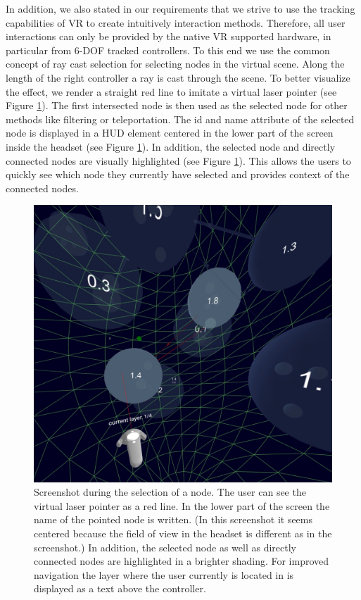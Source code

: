 In addition, we also stated in our requirements that we strive to use the tracking capabilities of VR to create intuitively interaction methods.
Therefore, all user interactions can only be provided by the native VR supported hardware, in particular from 6-DOF tracked controllers. 
To this end we use the common concept of ray cast selection for selecting nodes in the virtual scene. Along the length of the right controller a ray is cast through the scene. To better visualize the effect, we render a straight red line to imitate a virtual laser pointer (see Figure \ref{fig:screenshot_interaction}). The first intersected node is then used as the selected node for other methods like filtering or teleportation. The id and name attribute of the selected node is displayed in a HUD element centered in the lower part of the screen inside the headset (see Figure \ref{fig:screenshot_interaction}). In addition, the selected node and directly connected nodes are visually highlighted (see Figure \ref{fig:screenshot_interaction}). This allows the users to quickly see which node they currently have selected and provides context of the connected nodes.

\begin{figure}[h]
    \centering
    \includegraphics[width=1\textwidth]{graphics/screenShotFilteringNodes2.jpg}
    \caption[Screenshot during the selection of a node.]{Screenshot during the selection of a node. The user can see the virtual laser pointer as a red line. 
    In the lower part of the screen the name of the pointed node is written. (In this screenshot it seems centered because the field of view in the headset is different as in the screenshot.)    
    In addition, the selected node as well as directly connected nodes are highlighted in a brighter shading. For improved navigation the layer where the user currently is located in is displayed as a text above the controller.} 
    \label{fig:screenshot_interaction} 
\end{figure}

